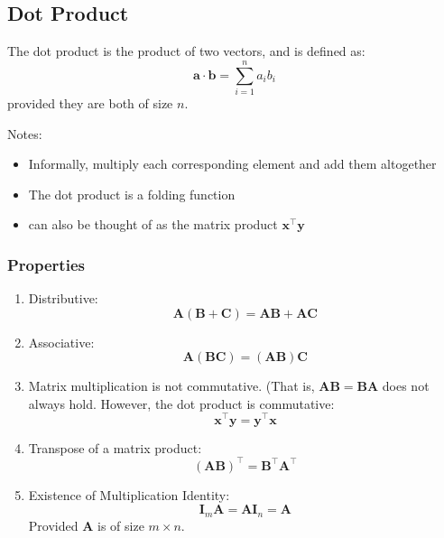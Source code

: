 \documentclass[11pt,twocolumn]{report}
\begin{document}
\subsection{Dot Product}
The dot product is the product of two vectors, and is defined as:
\begin{equation}
  \bm{a} \cdot \bm{b} = \sum_{i = 1}^n a_ib_i
\end{equation}
provided they are both of size $n$.\par
Notes:
\begin{itemize}
  \item Informally, multiply each corresponding element and add them altogether
  \item The dot product is a folding function
  \item can also be thought of as the matrix product $\bm{x}^\intercal\bm{y}$
\end{itemize}
\subsubsection{Properties}
\begin{enumerate}
  \item Distributive: 
    \begin{equation}
      \bm{A}(\bm{B} + \bm{C}) = \bm{AB} + \bm{AC}
    \end{equation}
  \item Associative:
    \begin{equation}
      \bm{A}(\bm{BC}) = (\bm{AB})\bm{C}
    \end{equation}
  \item Matrix multiplication is not commutative. (That is, $\bm{AB} = \bm{BA}$
    does not always hold. However, the dot product is commutative:
    \begin{equation}
      \bm{x}^\intercal\bm{y} = \bm{y}^\intercal\bm{x}
    \end{equation}
  \item Transpose of a matrix product:
    \begin{equation}
      (\bm{AB})^\intercal = \bm{B}^\intercal\bm{A}^\intercal
    \end{equation}
  \item Existence of Multiplication Identity:
    \begin{equation}
      \bm{I}_m\bm{A} = \bm{A}\bm{I}_n = \bm{A}
    \end{equation}
    Provided $\bm{A}$ is of size $m \times n$.
\end{enumerate}
\end{document}
